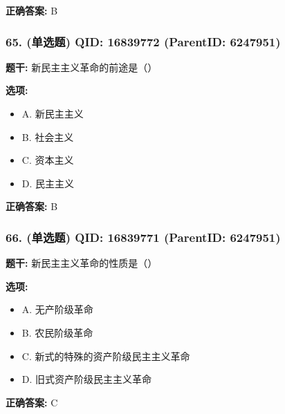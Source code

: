 \documentclass[12pt,UTF8]{ctexart}
\begin{document}
\textbf{正确答案:}
B

\vspace{0.3em}\hrulefill\vspace{0.7em}

\subsubsection*{65. (单选题) \small QID: 16839772 (ParentID: 6247951)}

\textbf{题干:}
新民主主义革命的前途是（）



\textbf{选项:}
\begin{itemize}[leftmargin=*]

  \item A. 新民主主义

  \item B. 社会主义

  \item C. 资本主义

  \item D. 民主主义

\end{itemize}

\textbf{正确答案:}
B

\vspace{0.3em}\hrulefill\vspace{0.7em}

\subsubsection*{66. (单选题) \small QID: 16839771 (ParentID: 6247951)}

\textbf{题干:}
新民主主义革命的性质是（）



\textbf{选项:}
\begin{itemize}[leftmargin=*]

  \item A. 无产阶级革命

  \item B. 农民阶级革命

  \item C. 新式的特殊的资产阶级民主主义革命

  \item D. 旧式资产阶级民主主义革命

\end{itemize}

\textbf{正确答案:}
C
\end{document}
